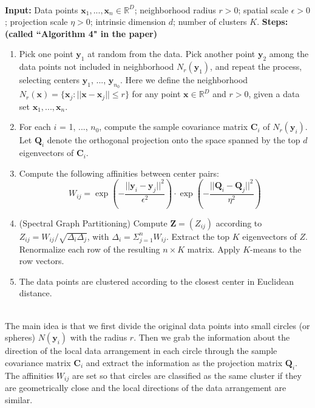 \noindent\hrulefill\\
\textbf{Input:} \newline
Data points $\boldsymbol{x}_1, ..., \boldsymbol{x}_n \in \mathbb{R}^D$; neighborhood radius $r>0$; spatial scale $\epsilon>0$; projection scale $\eta>0$; intrinsic dimension $d$; number of clusters $K$. \vspace{0.1in} \newline
\textbf{Steps:  (called ``Algorithm 4" in the paper)}
\begin{enumerate}
\item Pick one point $\boldsymbol{y}_1$ at random from the data.
Pick another point $\boldsymbol{y}_2$ among the data points not included in neighborhood $N_r(\boldsymbol{y}_1)$, and repeat the process, selecting centers $\boldsymbol{y}_1$, ..., $\boldsymbol{y}_{n_0}$.
Here we define the neighborhood $N_r(\boldsymbol{x})=\{\boldsymbol{x}_j : ||\boldsymbol{x}-\boldsymbol{x}_j|| \leq r\}$ for any point $\boldsymbol{x} \in \mathbb{R}^D$ and $r>0$, given a data set $\boldsymbol{x}_1, ..., \boldsymbol{x}_n$.
\item For each $i$ = 1, ..., $n_0$, compute the sample covariance matrix $\boldsymbol{C}_i$ of $N_r(\boldsymbol{y}_i)$.
Let $\boldsymbol{Q}_i$ denote the orthogonal projection onto the space spanned by the top $d$ eigenvectors of $\boldsymbol{C}_i$.
\item Compute the following affinities between center pairs:
\begin{equation}
W_{ij}=\exp \left( -\frac{||\boldsymbol{y}_i-\boldsymbol{y}_j||^2}{\epsilon^2} \right) \cdot \exp \left(-\frac{||\boldsymbol{Q}_i-\boldsymbol{Q}_j||^2}{\eta^2} \right)
\end{equation}
\item (Spectral Graph Partitioning) Compute $\boldsymbol{Z} = (Z_{ij})$ according to $Z_{ij} = W_{ij}/\sqrt{\Delta_i \Delta_j}$, with $\Delta_i=\Sigma_{j=1}^{n} W_{ij}$.
Extract the top $K$ eigenvectors of $Z$.
Renormalize each row of the resulting $n \times K$ matrix.
Apply $K$-means to the row vectors.
\item The data points are clustered according to the closest center in Euclidean distance.
\end{enumerate}
\noindent\hrulefill\\

The main idea is that we first divide the original data points into small circles (or spheres) $N(\boldsymbol{y}_i)$ with the radius $r$.
Then we grab the information about the direction of the local data arrangement in each circle through the sample covariance matrix $\boldsymbol{C}_i$ and extract the information as the projection matrix $\boldsymbol{Q}_i$.
The affinities $W_{ij}$ are set so that circles are classified as the same cluster if they are geometrically close and the local directions of the data arrangement are similar.



